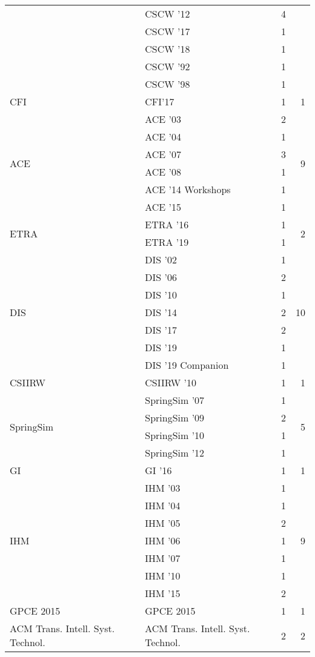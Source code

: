 \begin{table*}[t]
\begin{tabular}{llrr}
& CSCW '12 & 4 &\\
& CSCW '17 & 1 &\\
& CSCW '18 & 1 &\\
& CSCW '92 & 1 &\\
& CSCW '98 & 1 &\\
\multirow{1}{*}{CFI} & CFI'17 & 1 & \multirow{1}{*}{1}\\
\multirow{6}{*}{ACE } & ACE '03 & 2 & \multirow{6}{*}{9}\\
& ACE '04 & 1 &\\
& ACE '07 & 3 &\\
& ACE '08 & 1 &\\
& ACE '14 Workshops & 1 &\\
& ACE '15 & 1 &\\
\multirow{2}{*}{ETRA } & ETRA '16 & 1 & \multirow{2}{*}{2}\\
& ETRA '19 & 1 &\\
\multirow{7}{*}{DIS } & DIS '02 & 1 & \multirow{7}{*}{10}\\
& DIS '06 & 2 &\\
& DIS '10 & 1 &\\
& DIS '14 & 2 &\\
& DIS '17 & 2 &\\
& DIS '19 & 1 &\\
& DIS '19 Companion & 1 &\\
\multirow{1}{*}{CSIIRW } & CSIIRW '10 & 1 & \multirow{1}{*}{1}\\
\multirow{4}{*}{SpringSim } & SpringSim '07 & 1 & \multirow{4}{*}{5}\\
& SpringSim '09 & 2 &\\
& SpringSim '10 & 1 &\\
& SpringSim '12 & 1 &\\
\multirow{1}{*}{GI } & GI '16 & 1 & \multirow{1}{*}{1}\\
\multirow{7}{*}{IHM } & IHM '03 & 1 & \multirow{7}{*}{9}\\
& IHM '04 & 1 &\\
& IHM '05 & 2 &\\
& IHM '06 & 1 &\\
& IHM '07 & 1 &\\
& IHM '10 & 1 &\\
& IHM '15 & 2 &\\
\multirow{1}{*}{GPCE 2015} & GPCE 2015 & 1 & \multirow{1}{*}{1}\\
\multirow{1}{*}{ACM Trans. Intell. Syst. Technol.} & ACM Trans. Intell. Syst. Technol. & 2 & \multirow{1}{*}{2}\\

\end{tabular}
\end{table*}
